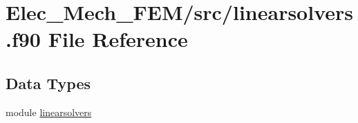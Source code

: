 \hypertarget{linearsolvers_8f90}{}\section{Elec\+\_\+\+Mech\+\_\+\+F\+E\+M/src/linearsolvers.f90 File Reference}
\label{linearsolvers_8f90}
\subsection*{Data Types}
\begin{DoxyCompactItemize}
\item 
module \hyperlink{classlinearsolvers}{linearsolvers}
\end{DoxyCompactItemize}

